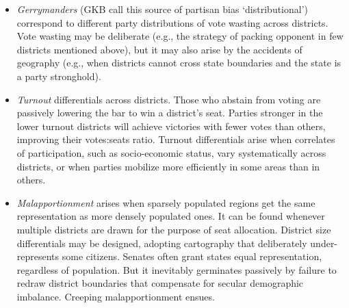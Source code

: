 \documentclass[letter,12pt]{article}
\begin{document}
\begin{itemize}
\item \emph{Gerrymanders} (GKB call this source of partisan bias `distributional') correspond to different party distributions of vote wasting across districts. Vote wasting may be deliberate (e.g., the strategy of packing opponent in few districts mentioned above), but it may also arise by the accidents of geography (e.g., when districts cannot cross state boundaries and the state is a party stronghold).
\item \emph{Turnout} differentials across districts. Those who abstain from voting are passively lowering the bar to win a district's seat. Parties stronger in the lower turnout districts will achieve victories with fewer votes than others, improving their votes:seats ratio. Turnout differentials arise when correlates of participation, such as socio-economic status, vary systematically across districts, or when parties mobilize more efficiently in some areas than in others. 
\item \emph{Malapportionment} arises when sparsely populated regions get the same representation as more densely populated ones. It can be found whenever multiple districts are drawn for the purpose of seat allocation. District size differentials may be designed, adopting cartography that deliberately under-represents some citizens. Senates often grant states equal representation, regardless of population. But it inevitably germinates passively by failure to redraw district boundaries that compensate for secular demographic imbalance. Creeping malapportionment ensues.
\end{itemize} 

\end{document}
